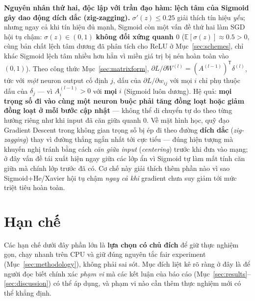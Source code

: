 \documentclass[12pt,a4paper]{report}
\newcommand{\en}[1]{\textit{#1}}
\newcommand{\T}{^{\mathsf{T}}}
\begin{document}
\textbf{Nguyên nhân thứ hai, độc lập với trần đạo hàm: lệch tâm của
Sigmoid gây dao động dích dắc (zig-zagging).} $\sigma'(z)\le0.25$ giải
thích tín hiệu \emph{yếu}; nhưng ngay cả khi tín hiệu đủ mạnh, Sigmoid còn
một vấn đề thứ hai làm SGD hội tụ chậm: $\sigma(z)\in(0,1)$
\textbf{không đối xứng quanh $0$} ($\mathbb E[\sigma(z)]\approx0.5>0$,
cùng bản chất lệch tâm dương đã phân tích cho ReLU ở Mục~\ref{sec:schemes},
chỉ khác Sigmoid lệch tâm nhiều hơn hẳn vì miền giá trị bị nén hoàn toàn
vào $(0,1)$). Theo công thức Mục~\ref{sec:matrixform},
$\partial L/\partial W^{(l)}=(A^{(l-1)})\T\delta^{(l)}$, tức với \emph{một}
neuron output cố định $j$, dấu của $\partial L/\partial w_{ij}$ với mọi
$i$ chỉ phụ thuộc dấu của $\delta_j$ --- vì $A^{(l-1)}_{i}>0$ với
\textbf{mọi} $i$ (Sigmoid luôn dương). Hệ quả: \textbf{mọi trọng số đi vào
cùng một neuron buộc phải tăng đồng loạt hoặc giảm đồng loạt ở mỗi bước
cập nhật} --- không thể di chuyển tự do theo từng hướng riêng như khi input
đã căn giữa quanh $0$. Về mặt hình học, quỹ đạo Gradient Descent trong
không gian trọng số bị ép đi theo đường \textbf{dích dắc}
(\en{zig-zagging}) thay vì đường thẳng ngắn nhất tới cực tiểu --- đúng
hiện tượng mà \citet{lecun1998efficient} khuyến nghị tránh bằng cách
\emph{căn giữa input} (\en{centering}) trước khi đưa vào mạng; ở đây vấn
đề tái xuất hiện ngay giữa các lớp ẩn vì Sigmoid tự làm mất tính căn giữa
mà chính lớp trước đã có. Cơ chế này giải thích thêm phần nào vì sao
Sigmoid+He/Xavier hội tụ chậm \emph{ngay cả khi} gradient chưa suy giảm
tới mức triệt tiêu hoàn toàn.

\section{Hạn chế}
\label{sec:limitations}

Các hạn chế dưới đây phần lớn là \textbf{lựa chọn có chủ đích} để giữ thực
nghiệm gọn, chạy nhanh trên CPU và giữ đúng nguyên tắc fair experiment
(Mục~\ref{sec:methodology}), không phải sai sót. Mục đích liệt kê rõ ràng
ở đây là để người đọc biết chính xác \emph{phạm vi} mà các kết luận của
báo cáo (Mục~\ref{sec:results}--\ref{sec:discussion}) có thể áp dụng, và
phạm vi nào cần thêm thực nghiệm mới có thể khẳng định.
\end{document}
